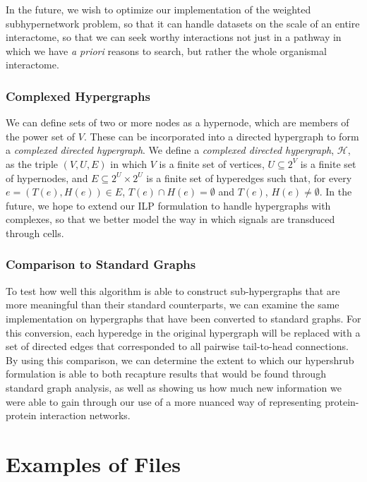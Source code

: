 \documentclass[12pt,twoside]{reedthesis}
\theoremstyle{definition}
\begin{document}
   In the future, we wish to optimize our implementation of the weighted subhypernetwork problem, so that it can handle datasets on the scale of an entire interactome, so that we can seek worthy interactions not just in a pathway in which we have \textit{a priori} reasons to search, but rather the whole organismal interactome.

   \subsection{Complexed Hypergraphs}

   We can define sets of two or more nodes as a hypernode, which are members of the power set of $V$.  These can be incorporated into a directed hypergraph to form a \textit{complexed directed hypergraph}.  We define a \textit{complexed directed hypergraph}, $\mathcal{H}$, as the triple $(V,U,E)$ in which $V$ is a finite set of vertices, $U \subseteq 2^V$ is a finite set of hypernodes, and $E \subseteq 2^U \times 2^U$ is a finite set of hyperedges such that, for every $e=(T(e),H(e)) \in E$, $T(e) \cap H(e) = \emptyset$ and $T(e)$, $H(e) \neq \emptyset$. In the future, we hope to extend our ILP formulation to handle hypergraphs with complexes, so that we better model the way in which signals are transduced through cells.\par

   \subsection{Comparison to Standard Graphs}

   To test how well this algorithm is able to construct sub-hypergraphs that are more meaningful than their standard counterparts, we can examine the same implementation on hypergraphs that have been converted to standard graphs. For this conversion, each hyperedge in the original hypergraph will be replaced with a set of directed edges that corresponded to all pairwise tail-to-head connections. By using this comparison, we can determine the extent to which our hypershrub formulation is able to both recapture results that would be found through standard graph analysis, as well as showing us how much new information we were able to gain through our use of a more nuanced way of representing protein-protein interaction networks.



    \appendix
      \chapter{Examples of Files}
\end{document}
